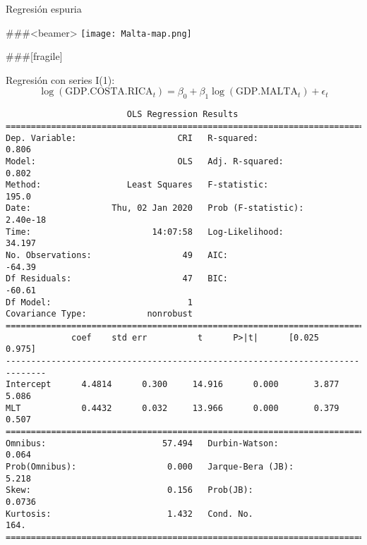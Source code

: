 \begin{EXAMPLE}{Regresión espuria}

###<beamer>
\texttt{[image: Malta-map.png]}



###[fragile]

Regresión con series I(1):
\begin{equation*}
\log(\text{GDP.COSTA.RICA}_t) = \beta_0 + \beta_1\log(\text{GDP.MALTA}_t) + \epsilon_t
\end{equation*}

\begin{verbatim}
                        OLS Regression Results
==============================================================================
Dep. Variable:                    CRI   R-squared:                       0.806
Model:                            OLS   Adj. R-squared:                  0.802
Method:                 Least Squares   F-statistic:                     195.0
Date:                Thu, 02 Jan 2020   Prob (F-statistic):           2.40e-18
Time:                        14:07:58   Log-Likelihood:                 34.197
No. Observations:                  49   AIC:                            -64.39
Df Residuals:                      47   BIC:                            -60.61
Df Model:                           1
Covariance Type:            nonrobust
==============================================================================
             coef    std err          t      P>|t|      [0.025      0.975]
------------------------------------------------------------------------------
Intercept      4.4814      0.300     14.916      0.000       3.877       5.086
MLT            0.4432      0.032     13.966      0.000       0.379       0.507
==============================================================================
Omnibus:                       57.494   Durbin-Watson:                   0.064
Prob(Omnibus):                  0.000   Jarque-Bera (JB):                5.218
Skew:                           0.156   Prob(JB):                       0.0736
Kurtosis:                       1.432   Cond. No.                         164.
==============================================================================
\end{verbatim}



\end{EXAMPLE}
